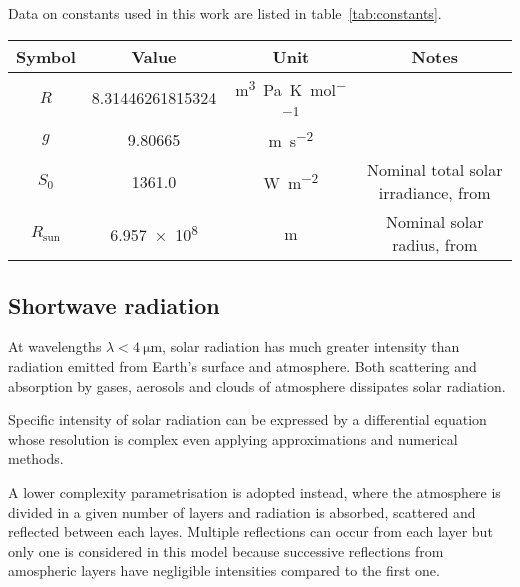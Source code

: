 \documentclass[a4paper,10pt,draft,twocolumn]{article}
\begin{document}
Data on constants used in this work are listed in table~\ref{tab:constants}.
\begin{table*}[h]
  \centering
  \caption{Data on constants used in the present work.}
  \label{tab:constants}
  \begin{tabular}[b]{cccc}
    \toprule
    Symbol           & Value                  & Unit                                           & Notes \\
    \midrule
    $R$              & \num{8.31446261815324} & \unit{\cubic\metre\pascal\per\kelvin\per\mole} &       \\
    $g$              & \num{9.80665}          & \unit{\metre\per\square\second}                &       \\
    $S_0$            & \num{1361.0}             & \unit{\watt\per\square\metre}                  & Nominal total solar irradiance, from \cite{IAU} \\
    $R_\mathrm{sun}$ & \num{6.957e8}          & \unit{\metre}                                  & Nominal solar radius, from \cite{IAU} \\
    \bottomrule
  \end{tabular}
\end{table*}

\subsection{Shortwave radiation}
At wavelengths $\lambda < \qty{4}{\micro\metre}$, solar radiation has much greater intensity than radiation emitted from Earth's surface and atmosphere. Both scattering and absorption by gases, aerosols and clouds of atmosphere dissipates solar radiation.\cite[469]{ramanathan}

Specific intensity of solar radiation can be expressed by a differential equation whose resolution is complex even applying approximations and numerical methods.\cite[469]{ramanathan}

A lower complexity parametrisation is adopted instead, where the atmosphere is divided in a given number of layers and radiation is absorbed, scattered and reflected between each layes. Multiple reflections can occur from each layer but only one is considered in this model because successive reflections from amospheric layers have negligible intensities compared to the first one.\cite[470]{ramanathan}

\end{document}
